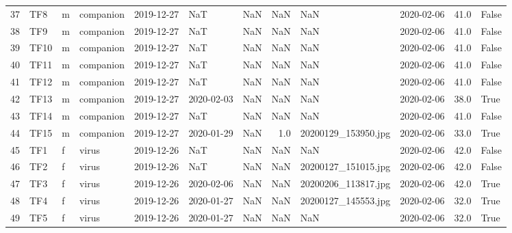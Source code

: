\begin{longtable}{llllllrrllrl}
37 &    TF8 &   m &  companion &   2019-12-27 &        NaT &               NaN &                  NaN &                      NaN &        2020-02-06 &  41.0 &  False \\
38 &    TF9 &   m &  companion &   2019-12-27 &        NaT &               NaN &                  NaN &                      NaN &        2020-02-06 &  41.0 &  False \\
39 &   TF10 &   m &  companion &   2019-12-27 &        NaT &               NaN &                  NaN &                      NaN &        2020-02-06 &  41.0 &  False \\
40 &   TF11 &   m &  companion &   2019-12-27 &        NaT &               NaN &                  NaN &                      NaN &        2020-02-06 &  41.0 &  False \\
41 &   TF12 &   m &  companion &   2019-12-27 &        NaT &               NaN &                  NaN &                      NaN &        2020-02-06 &  41.0 &  False \\
42 &   TF13 &   m &  companion &   2019-12-27 & 2020-02-03 &               NaN &                  NaN &                      NaN &        2020-02-06 &  38.0 &   True \\
43 &   TF14 &   m &  companion &   2019-12-27 &        NaT &               NaN &                  NaN &                      NaN &        2020-02-06 &  41.0 &  False \\
44 &   TF15 &   m &  companion &   2019-12-27 & 2020-01-29 &               NaN &                  1.0 &      20200129\_153950.jpg &        2020-02-06 &  33.0 &   True \\
45 &    TF1 &   f &      virus &   2019-12-26 &        NaT &               NaN &                  NaN &                      NaN &        2020-02-06 &  42.0 &  False \\
46 &    TF2 &   f &      virus &   2019-12-26 &        NaT &               NaN &                  NaN &      20200127\_151015.jpg &        2020-02-06 &  42.0 &  False \\
47 &    TF3 &   f &      virus &   2019-12-26 & 2020-02-06 &               NaN &                  NaN &      20200206\_113817.jpg &        2020-02-06 &  42.0 &   True \\
48 &    TF4 &   f &      virus &   2019-12-26 & 2020-01-27 &               NaN &                  NaN &      20200127\_145553.jpg &        2020-02-06 &  32.0 &   True \\
49 &    TF5 &   f &      virus &   2019-12-26 & 2020-01-27 &               NaN &                  NaN &                      NaN &        2020-02-06 &  32.0 &   True \\

\end{longtable}

